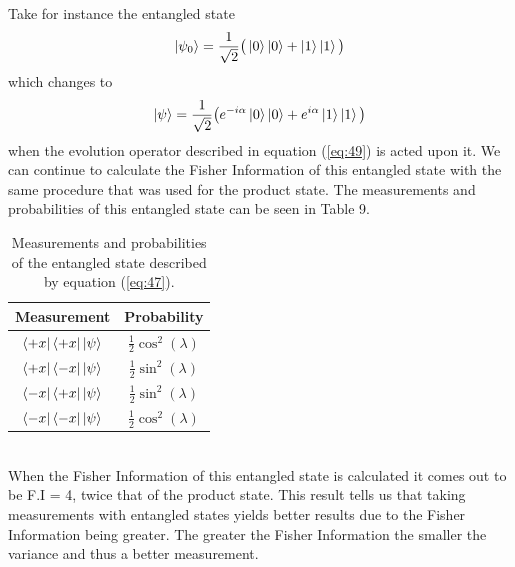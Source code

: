 \documentclass[twocolumn]{article}
\begin{document}
Take for instance the entangled state
\begin{equation} \label{eq:55}
\ket{\psi_0}=\frac{1}{\sqrt{2}}\big(\ket{0}\ket{0}+\ket{1}\ket{1}\big)
\end{equation}
which changes to 
\begin{equation} \label{eq:56}
\ket{\psi}=\frac{1}{\sqrt{2}}\big(e^{-i\alpha}\ket{0}\ket{0}+e^{i\alpha}\ket{1}\ket{1}\big)
\end{equation}
when the evolution operator described in equation (\ref{eq:49}) is acted upon it. We can continue to calculate the Fisher Information of this entangled state with the same procedure that was used for the product state. The measurements and probabilities of this entangled state can be seen in Table 9.
\begin{table}[h!]
\begin{center}
\begin{tabular}{ |c|c| }
\hline Measurement & Probability \\
\hline $\bra{+x}\bra{+x}\ket{\psi}$ & $\frac{1}{2}\cos^2{(\lambda)}$ \\
\hline $\bra{+x}\bra{-x}\ket{\psi}$ & $\frac{1}{2}\sin^2{(\lambda)}$ \\
\hline $\bra{-x}\bra{+x}\ket{\psi}$ & $\frac{1}{2}\sin^2{(\lambda)}$ \\
\hline $\bra{-x}\bra{-x}\ket{\psi}$ & $\frac{1}{2}\cos^2{(\lambda)}$ \\
\hline
\end{tabular}
\caption{Measurements and probabilities of the entangled state described by equation (\ref{eq:47}).}
\end{center}
\end{table} \\
When the Fisher Information of this entangled state is calculated it comes out to be F.I = 4, twice that of the product state. This result tells us that taking measurements with entangled states yields better results due to the Fisher Information being greater. The greater the Fisher Information the smaller the variance and thus a better measurement.
\end{document}
